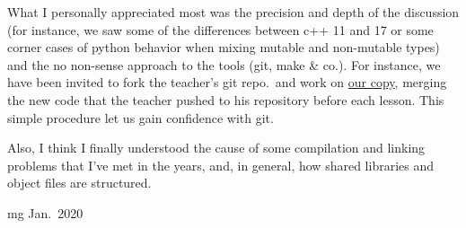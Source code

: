 \documentclass[a4paper,11pt]{article}
\begin{document}

\bigskip
What I personally appreciated most was the precision and depth of the
discussion (for instance, we saw some of the differences between c++
11 and 17 or some corner cases of python behavior when mixing mutable
and non-mutable types) and the no non-sense approach to the tools
(git, make \& co.). For instance, we have been invited to fork the
teacher's git repo.\ and work on
\href{https://github.com/gamboz/advanced_programming_2019-20}
     {our copy}, merging the new code that
the teacher pushed to his repository before each lesson. This simple
procedure let us gain confidence with git.

Also, I think I finally understood the cause of some compilation and
linking problems that I've met in the years, and, in general, how
shared libraries and object files are structured.

\begin{flushright}
\scriptsize  mg Jan.\ 2020
\end{flushright}
\end{document}
